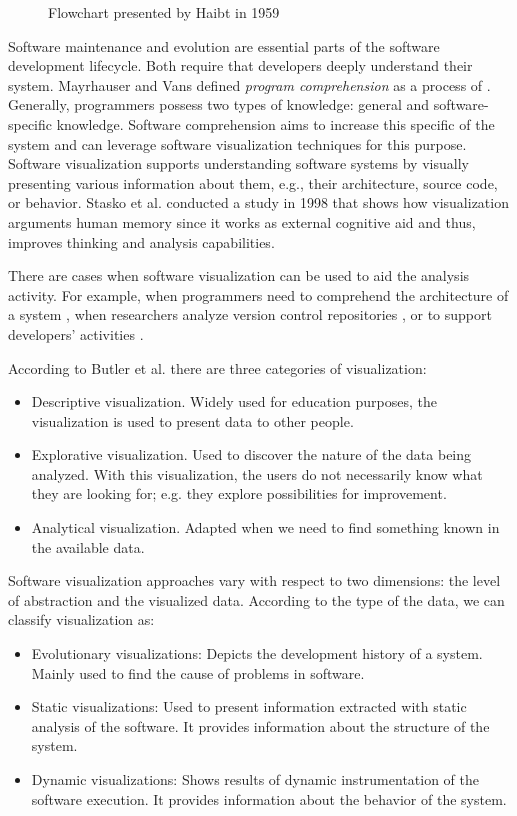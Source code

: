 \begin{figure}
  \caption{Flowchart presented by Haibt in 1959}
  \label{fig:Haibt1959_Flowchart}

\end{figure}

Software maintenance and evolution are essential parts of the software development lifecycle. Both require that developers deeply understand their system. 
Mayrhauser and Vans defined {\it program comprehension} as a process of  \cite{VonMayrhauser1995}. 
Generally, programmers possess two types of knowledge: general and software-specific knowledge. 
Software comprehension aims to increase this specific of the system and can leverage software visualization techniques for this purpose. 
Software visualization supports understanding software systems by visually presenting various information about them, e.g., their architecture, source code, or behavior.
Stasko et al. \cite{Stasko2008} conducted a study in 1998 that shows how visualization arguments human memory since 
it works as external cognitive aid and thus, improves thinking and analysis capabilities.

There are cases when software visualization can be used to aid the analysis activity. For example, when programmers need to comprehend the architecture of a system \cite{Panas2007}, when researchers analyze version control repositories \cite{Greene2017}, or to support developers' activities \cite{LopezHerrejon2018}. 

According to Butler et al. \cite{Butler1993} there are three categories of visualization:
\begin{itemize}
	 \item Descriptive visualization. Widely used for education purposes, the visualization is used to present data to other people. 
	 \item Explorative visualization. Used to discover the nature of the data being analyzed. With this visualization, the users do not necessarily know what they are looking for; e.g. they explore possibilities for improvement.
	 \item Analytical visualization. Adapted when we need to find something known in the available data. 
\end{itemize}
Software visualization approaches vary with respect to two dimensions: the level of abstraction and the visualized data.
According to the type of the data, we can classify visualization as:
\begin{itemize}
	\item Evolutionary visualizations: Depicts the development history of a system. Mainly used to find the cause of problems in software. 
	\item Static visualizations: Used to present information extracted with static analysis of the software. It provides information about the structure of the system.
	\item Dynamic visualizations: Shows results of dynamic instrumentation of the software execution. It provides information about the behavior of the system.
\end{itemize}

